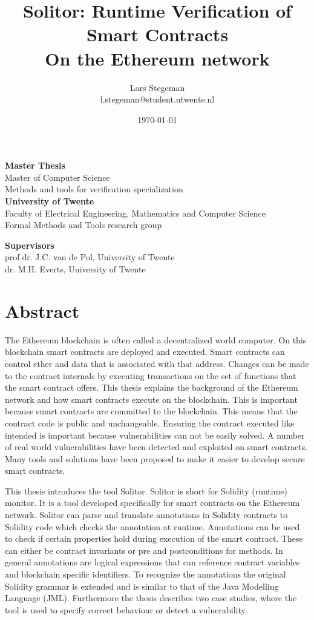\documentclass[a4paper]{article}
\title{\vspace{3.0cm}\textbf{Solitor: Runtime Verification of Smart Contracts}\\
\large On the Ethereum network \\}
\author{Lars Stegeman\\ l.stegeman@student.utwente.nl}
\date{\vspace{0.5cm}\today}
\begin{document}
\begin{titlepage}
\maketitle
\vspace{1.5cm}
\begin{center}
\textbf{Master Thesis}\\
Master of Computer Science\\
Methods and tools for verification specialization\\
\vspace{0.5cm}
\textbf{University of Twente}\\
Faculty of Electrical Engineering, Mathematics and Computer Science\\
Formal Methods and Tools research group\\
\end{center}
\vfill
\textbf{Supervisors}\\
prof.dr. J.C. van de Pol, University of Twente\\
dr. M.H. Everts, University of Twente\\
\end{titlepage}

\newpage
\section*{Abstract}
The Ethereum blockchain is often called a decentralized world computer. On this blockchain smart contracts are deployed and executed. Smart contracts can control ether and data that is associated with that address. Changes can be made to the contract internals by executing transactions on the set of functions that the smart contract offers. This thesis explains the background of the Ethereum network and how smart contracts execute on the blockchain. This is important because smart contracts are committed to the blockchain. This means that the contract code is public and unchangeable. Ensuring the contract executed like intended is important because vulnerabilities can not be easily solved. A number of real world vulnerabilities have been detected and exploited on smart contracts. Many tools and solutions have been proposed to make it easier to develop secure smart contracts.
\par
This thesis introduces the tool Solitor. Solitor is short for Solidity (runtime) monitor. It is a tool developed specifically for smart contracts on the Ethereum network. Solitor can parse and translate annotations in Solidity contracts to Solidity code which checks the annotation at runtime. Annotations can be used to check if certain properties hold during execution of the smart contract. These can either be contract invariants or pre and postconditions for methods. In general annotations are logical expressions that can reference contract variables and blockchain specific identifiers. To recognize the annotations the original Solidity grammar is extended and is similar to that of the Java Modelling Language (JML). Furthermore the thesis describes two case studies, where the tool is used to specify correct behaviour or detect a vulnerability.
\end{document}
